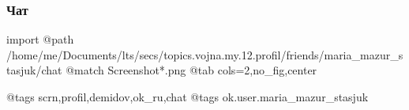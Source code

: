  
 
 
 
 

\subsubsection{Чат}

\ifcmt
  import
  @path /home/me/Documents/lts/secs/topics.vojna.my.12.profil/friends/maria_mazur_stasjuk/chat
  @match Screenshot*.png
  @tab cols=2,no_fig,center

  @tags scrn,profil,demidov,ok_ru,chat
  @tags ok.user.maria_mazur_stasjuk

\fi
